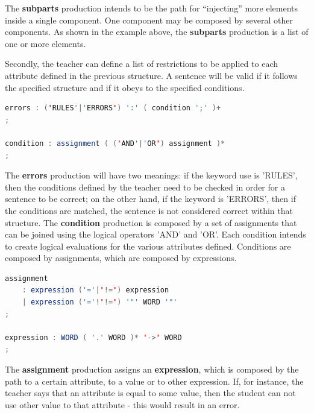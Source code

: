 The \textbf{subparts} production intends to be the path for ``injecting'' more elements inside a single component. One component may be composed by several other components. As shown in the example above, the \textbf{subparts} production is a list of one or more elements.

Secondly, the teacher can define a list of restrictions to be applied to each attribute defined in the previous structure. A sentence will be valid if it follows the specified structure and if it obeys to the specified conditions.

\begin{center}
\begin{minipage}{12cm}
\begin{lstlisting}[language=java, basicstyle=\small, label={lst:dsl_errors_prod}, caption=DSL errors/expression productions]
errors : ('RULES'|'ERRORS') ':' ( condition ';' )+
;

condition : assignment ( ('AND'|'OR') assignment )*
;
\end{lstlisting}
\end{minipage}
\end{center}

The \textbf{errors} production will have two meanings: if the keyword use is 'RULES', then the conditions defined by the teacher need to be checked in order for a sentence to be correct; on the other hand, if the keyword is 'ERRORS', then if the conditions are matched, the sentence is not considered correct within that structure.
The \textbf{condition} production is composed by a set of assignments that can be joined using the logical operators 'AND' and 'OR'. 
Each condition intends to create logical evaluations for the various attributes defined.
Conditions are composed by assignments, which are composed by expressions.

\begin{center}
\begin{minipage}{10cm}
\begin{lstlisting}[language=java, basicstyle=\small, label={lst:dsl_cond_prod}, caption=DSL condition production]
assignment 
    : expression ('='|'!=') expression
    | expression ('='!'!=') '"' WORD '"'
;

expression : WORD ( '.' WORD )* '->' WORD 
;
\end{lstlisting}
\end{minipage}
\end{center}

The \textbf{assignment} production assigns an \textbf{expression}, which is composed by the path to a certain attribute, to a value or to other expression. 
If, for instance, the teacher says that an attribute is equal to some value, then the student can not use other value to that attribute - this would result in an error.


